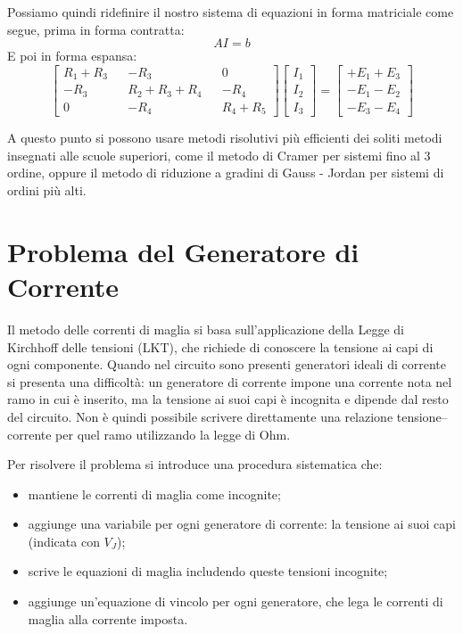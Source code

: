 Possiamo quindi ridefinire il nostro sistema di equazioni in forma matriciale come segue, prima in forma contratta:
\begin{equation}
    AI = b
\end{equation}
E poi in forma espansa:
\begin{equation}
    \begin{bmatrix}
        R_1+R_3 && -R_3   && 0      \\
        -R_3    && R_2+R_3+R_4 && -R_4 \\
        0       && -R_4   && R_4+R_5
    \end{bmatrix}
    \begin{bmatrix}
        I_1      \\
        I_2    \\
        I_3      
   \end{bmatrix}
            = 
    \begin{bmatrix}
        + E_1 + E_3 \\
        - E_1 - E_2 \\
        - E_3 - E_4
    \end{bmatrix}
\end{equation}

A questo punto si possono usare metodi risolutivi più efficienti dei soliti metodi insegnati alle scuole superiori, come il metodo di Cramer per sistemi fino al 3 ordine, oppure il metodo di riduzione a gradini di Gauss - Jordan per sistemi di ordini più alti.

\section{Problema del Generatore di Corrente}

Il metodo delle correnti di maglia si basa sull’applicazione della Legge di Kirchhoff delle tensioni (LKT), che richiede di conoscere la tensione ai capi di ogni componente. Quando nel circuito sono presenti generatori ideali di corrente si presenta una difficoltà: un generatore di corrente impone una corrente nota nel ramo in cui è inserito, ma la tensione ai suoi capi è incognita e dipende dal resto del circuito. Non è quindi possibile scrivere direttamente una relazione tensione–corrente per quel ramo utilizzando la legge di Ohm.

Per risolvere il problema si introduce una procedura sistematica che:
\begin{itemize}
    \item mantiene le correnti di maglia come incognite;
    \item aggiunge una variabile per ogni generatore di corrente: la tensione ai suoi capi (indicata con \(V_J\));
    \item scrive le equazioni di maglia includendo queste tensioni incognite;
    \item aggiunge un’equazione di vincolo per ogni generatore, che lega le correnti di maglia alla corrente imposta.
\end{itemize}


